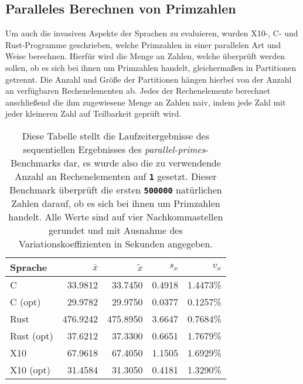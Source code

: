 \FloatBarrier

\subsection{Paralleles Berechnen von Primzahlen}

Um auch die invasiven Aspekte der Sprachen zu evaluieren, wurden X10-, C- und Rust-Programme geschrieben,
welche Primzahlen in einer parallelen Art und Weise berechnen.
Hierfür wird die Menge an Zahlen, welche überprüft werden sollen,
ob es sich bei ihnen um Primzahlen handelt, gleichermaßen in Partitionen getrennt.
Die Anzahl und Größe der Partitionen hängen hierbei von der Anzahl an verfügbaren Rechenelementen ab.
Jedes der Rechenelemente berechnet anschließend die ihm zugewiesene Menge an Zahlen naiv,
indem jede Zahl mit jeder kleineren Zahl auf Teilbarkeit geprüft wird.

\begin{table}[hb]
	\begin{center}
		\begin{tabular}{lrrrr}
			\toprule
			Sprache & $\bar{x}$ & $\tilde{x}$ & $s_x$ & $v_x$ \\
			\midrule
			C          &  33.9812 &  33.7450 & 0.4918 & 1.4473\% \\
			C (opt)    &  29.9782 &  29.9750 & 0.0377 & 0.1257\% \\
			Rust       & 476.9242 & 475.8950 & 3.6647 & 0.7684\% \\
			Rust (opt) &  37.6212 &  37.3300 & 0.6651 & 1.7679\% \\
			X10        &  67.9618 &  67.4050 & 1.1505 & 1.6929\% \\
			X10 (opt)  &  31.4584 &  31.3050 & 0.4181 & 1.3290\% \\
			\bottomrule
		\end{tabular}
	\end{center}
	\caption{
		Diese Tabelle stellt die Laufzeitergebnisse des sequentiellen Ergebnisses des
		\textit{parallel-primes}-Benchmarks dar,
		es wurde also die zu verwendende Anzahl an Rechenelementen auf \texttt{\textsc{\textbf{1}}} gesetzt.
		Dieser Benchmark überprüft die ersten \texttt{\textsc{\textbf{500000}}} natürlichen Zahlen darauf,
		ob es sich bei ihnen um Primzahlen handelt.
		Alle Werte sind auf vier Nachkommastellen gerundet und mit Ausnahme des Variationskoeffizienten
		in Sekunden angegeben.
	}
	\label{fig:primes_parallel_one_table}
\end{table}

